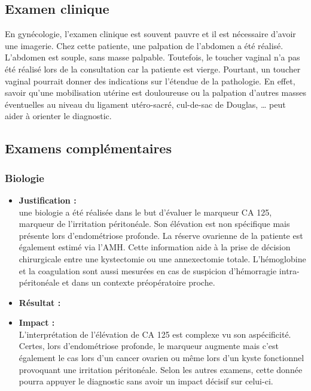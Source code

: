 \newpage

\subsection{Examen clinique} 
En gynécologie, l’examen clinique est souvent pauvre et il est nécessaire d’avoir une imagerie. Chez cette patiente, une palpation de l’abdomen a été réalisé. L’abdomen est souple, sans masse palpable. Toutefois, le toucher vaginal n’a pas été réalisé lors de la consultation car la patiente est vierge. Pourtant, un toucher vaginal pourrait donner des indications sur l’étendue de la pathologie. En effet, savoir qu’une mobilisation utérine est douloureuse ou la palpation d’autres masses éventuelles au niveau du ligament utéro-sacré, cul-de-sac de Douglas, \ldots{ } peut aider à orienter le diagnostic.

\subsection{Examens complémentaires}

\subsubsection{Biologie}
\begin{itemize}[label=\textbullet]
    \item \textbf{Justification :}\\
    une biologie a été réalisée dans le but d’évaluer le marqueur CA 125, marqueur de l’irritation péritonéale. Son élévation est non spécifique mais présente lors d’endométriose profonde. La réserve ovarienne de la patiente est également estimé via l’AMH. Cette information aide à la prise de décision chirurgicale entre une kystectomie ou une annexectomie totale. L’hémoglobine et la coagulation sont aussi mesurées en cas de suspicion d’hémorragie intra-péritonéale et dans un contexte préopératoire proche.
    
    \item \textbf{Résultat :}%
        
        
    \item \textbf{Impact :}\\
    L’interprétation de l’élévation de CA 125 est complexe vu son aspécificité. Certes, lors d’endométriose profonde, le marqueur augmente mais c’est également le cas lors d’un cancer ovarien ou même lors d’un kyste fonctionnel provoquant une irritation péritonéale. Selon les autres examens, cette donnée pourra appuyer le diagnostic sans avoir un impact décisif sur celui-ci.
    
\end{itemize}

